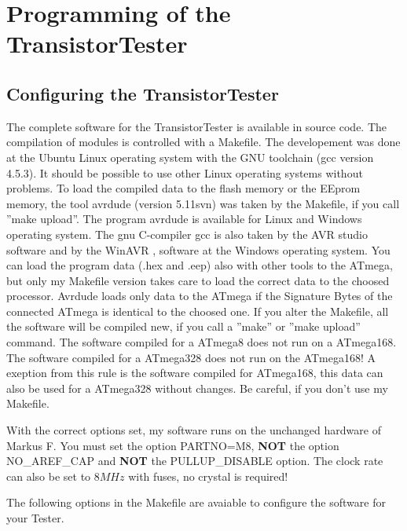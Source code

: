 \chapter{Programming of the TransistorTester}
\section{Configuring the TransistorTester}
\label{sec:config}
The complete software for the TransistorTester is available in source code.
The compilation of modules is controlled with a Makefile. The developement was done
at the Ubuntu Linux operating system with the GNU toolchain (gcc version 4.5.3).
It should be possible to use other Linux operating systems without problems.
To load the compiled data to the flash memory or
the EEprom memory, the tool avrdude (version 5.11svn) was taken by the Makefile, if you call ''make upload''.
 The program avrdude \cite{avrdude} is available for Linux and Windows operating system.
The gnu C-compiler gcc is also taken by the AVR studio software and
by the WinAVR \cite{winavr1},\cite{winavr2} software at the Windows operating system.
You can load the program data (.hex and .eep) also with other tools to the ATmega,
but only my Makefile version takes care to load the correct data to the choosed processor.
Avrdude loads only data to the ATmega if the Signature Bytes of the connected ATmega is
identical to the choosed one. 
If you alter the Makefile, all the software will be compiled new, if you call a ''make'' or
''make upload'' command. The software compiled for a ATmega8 does not run on a ATmega168.
The software compiled for a ATmega328 does not run on the ATmega168! 
A exeption from this rule is the software compiled for ATmega168, this data can also be used
for a ATmega328 without changes.
Be careful, if you don't use my Makefile.

With the correct options set, my software runs on the unchanged hardware of Markus F.
You must set the option PARTNO=M8, \textbf {NOT} the option NO\_AREF\_CAP and \textbf {NOT} the  PULLUP\_DISABLE option.
The clock rate can also be set to \(8MHz\) with fuses, no crystal is required!


The following options in the Makefile are avaiable to configure the software for your Tester.

